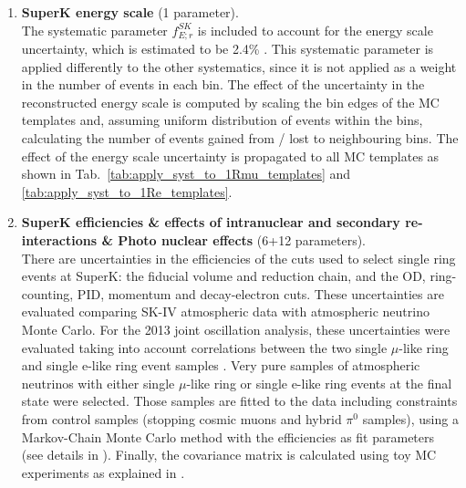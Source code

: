 \begin{enumerate}


\item 
{\bf SuperK energy scale} (1 parameter).\\
The systematic parameter $f_{E; r}^{SK}$ is included to account for the energy scale uncertainty, 
which is estimated to be 2.4\% \cite{SuperkEScale2013}.
This systematic parameter is applied differently to the other systematics, since it is not applied as a weight in the number of events in each bin. 
The effect of the uncertainty in the reconstructed energy scale is computed by scaling the bin edges of
the MC templates and, assuming uniform distribution of events within the bins, calculating the number
of events gained from / lost to neighbouring bins. 
The effect of the energy scale uncertainty is propagated to all MC templates as shown in Tab.\ \ref{tab:apply_syst_to_1Rmu_templates} and \ref{tab:apply_syst_to_1Re_templates}.\\



\item 
{\bf SuperK efficiencies \& effects of intranuclear and secondary re-interactions \& Photo nuclear effects } (6+12 parameters).\\

There are uncertainties in the efficiencies of the cuts used to select single ring events at SuperK: the fiducial volume and reduction chain, and the OD, ring-counting, PID, momentum and decay-electron cuts.
These uncertainties are evaluated comparing SK-IV atmospheric data with atmospheric neutrino Monte Carlo.
For the 2013 joint oscillation analysis, these uncertainties were evaluated taking into account correlations between
the two single $\mu$-like ring and single e-like ring event samples \cite{SKcorrelations}.
Very pure samples of atmospheric neutrinos with either single $\mu$-like ring or single e-like ring events at the final state were selected. Those samples are fitted to the data including constraints from control samples (stopping cosmic muons and hybrid $\pi^0$ samples), using a Markov-Chain Monte Carlo method with the efficiencies as fit parameters (see details in \cite{PatrickPlenary}).
Finally, the covariance matrix is calculated using toy MC experiments as explained in \cite{ImberTalk}. 


\end{enumerate}
